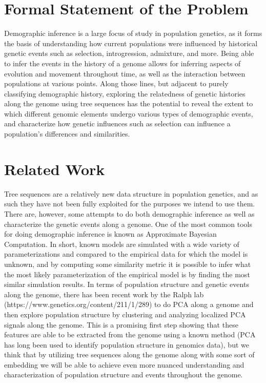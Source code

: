 \documentclass{article}
\begin{document}
\section{Formal Statement of the Problem}
Demographic inference is a large focus of study in population genetics, as it forms the basis of understanding how current populations were influenced by historical genetic events such as selection, introgression, admixture, and more. Being able to infer the events in the history of a genome allows for inferring aspects of evolution and movement throughout time, as well as the interaction between populations at various points. 
Along those lines, but adjacent to purely classifying demographic history, exploring the relatedness of genetic histories along the genome using tree sequences has the potential to reveal the extent to which different genomic elements undergo various types of demographic events, and characterize how genetic influences such as selection can influence a population's differences and similarities.

\section{Related Work}
Tree sequences are a relatively new data structure in population genetics, and as such they have not been fully exploited for the purposes we intend to use them. There are, however, some attempts to do both demographic inference as well as characterize the genetic events along a genome. One of the most common tools for doing demographic inference is known as Approximate Bayesian Computation. In short, known models are simulated with a wide variety of parameterizations and compared to the empirical data for which the model is unknown, and by computing some similarity metric it is possible to infer what the most likely parameterization of the empirical model is by finding the most similar simulation results.
In terms of population structure and genetic events along the genome, there has been recent work by the Ralph lab (https://www.genetics.org/content/211/1/289) to do PCA along a genome and then explore population structure by clustering and analyzing localized PCA signals along the genome. This is a promising first step showing that these features are able to be extracted from the genome using a known method (PCA has long been used to identify population structure in genomics data), but we think that by utilizing tree sequences along the genome along with some sort of embedding we will be able to achieve even more nuanced understanding and characterization of population structure and events throughout the genome. 
\end{document}
